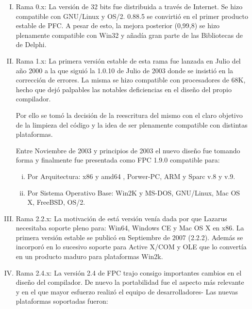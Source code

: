 \begin{enumerate}[I.]

\item Rama 0.x: La versión de 32 bits fue distribuida a través de Internet. Se 
hizo compatible con GNU/Linux y OS/2. 0.88.5 se convirtió en el primer producto 
estable de PFC. A pesar de esto, la mejora posterior (0,99,8) se hizo 
plenamente compatible con Win32 y añadía gran parte de las Bibliotecas de de 
Delphi.

\item Rama 1.x: La primera versión estable de esta rama fue lanzada en Julio 
del año 2000 a la que siguió la 1.0.10 de Julio de 2003 donde se insistió en la 
corrección de errores. La misma se hizo compatible con procesadores de 68K, 
hecho que dejó palpables las notables deficiencias en el diseño del propio 
compilador. 

Por ello se tomó la decisión de la reescritura del mismo con el claro objetivo 
de la limpieza del código y la idea de ser plenamente compatible con distintas 
plataformas.

Entre Noviembre de 2003 y principios de 2003 el nuevo diseño fue tomando forma 
y finalmente fue presentada como FPC 1.9.0 compatible para:

\begin{enumerate}[i.]

\item Por Arquitectura: x86 y amd64 , Porwer-PC, ARM y Sparc v.8 y v.9.

\item Por Sistema Operativo Base: Win2K y MS-DOS, GNU/Linux, Mac OS X, FreeBSD, OS/2.

\end{enumerate}

\item Rama 2.2.x: La motivación de está versión venía dada por que Lazarus necesitaba soporte pleno para: Win64, Windows CE y Mac OS X en x86.
La primera versión estable se publicó en Septiembre de 2007 (2.2.2). Además se incorporó en lo sucesivo soporte para Active X/COM y OLE que lo convertía en un producto maduro para plataformas Win2k.

\item Rama 2.4.x: La versión 2.4 de FPC trajo consigo importantes cambios en el diseño del compilador. 
De nuevo la portabilidad fue el aspecto más relevante y en el que mayor esfuerzo realizó el equipo de desarrolladores- Las nuevas plataformas soportadas fueron:

\begin{enumerate}[i.]


\end{enumerate}
\end{enumerate}
